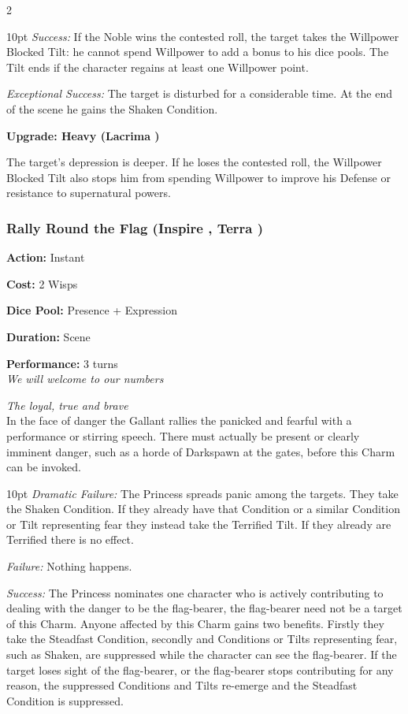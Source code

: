 \begin{multicols}{2}
\begin{myindentpar}{10pt}
    \emph{Success:} If the Noble wins the contested roll, the target takes the Willpower Blocked Tilt: he cannot spend Willpower to add a bonus to his dice pools. The Tilt ends if the character regains at least one Willpower point.

    \emph{Exceptional Success:}  The target is disturbed for a considerable time. At the end of the scene he gains the Shaken Condition.
	
	\textbf{Upgrade: Heavy (Lacrima \textbullet\textbullet\textbullet)}

	The target’s depression is deeper. If he loses the contested roll, the Willpower Blocked Tilt also stops him from spending Willpower to improve his Defense or resistance to supernatural powers.\end{myindentpar}
	
\subsubsection*{Rally Round the Flag (Inspire \textbullet\textbullet, Terra \textbullet\textbullet\textbullet)}

\noindent \textbf{Action:} Instant

\noindent \textbf{Cost:} 2 Wisps

\noindent \textbf{Dice Pool:} Presence + Expression

\noindent \textbf{Duration:} Scene

\noindent \textbf{Performance:} 3 turns \\	

\textit{We will welcome to our numbers}

\textit{The loyal, true and brave} \\

In the face of danger the Gallant rallies the panicked and fearful with a performance or stirring speech. There must actually be present or clearly imminent danger, such as a horde of Darkspawn at the gates, before this Charm can be invoked. 

\begin{myindentpar}{10pt}  \emph{Dramatic Failure:} The Princess spreads panic among the targets. They take the Shaken Condition. If they already have that Condition or a similar Condition or Tilt representing fear they instead take the Terrified Tilt. If they already are Terrified there is no effect.

    \emph{Failure:}  Nothing happens. 

    \emph{Success:} The Princess nominates one character who is actively contributing to dealing with the danger to be the flag-bearer, the flag-bearer need not be a target of this Charm. Anyone affected by this Charm gains two benefits. Firstly they take the Steadfast Condition, secondly and Conditions or Tilts representing fear, such as Shaken, are suppressed while the character can see the flag-bearer. If the target loses sight of the flag-bearer, or the flag-bearer stops contributing for any reason, the suppressed Conditions and Tilts re-emerge and the Steadfast Condition is suppressed. 


\end{myindentpar}
\end{multicols}
